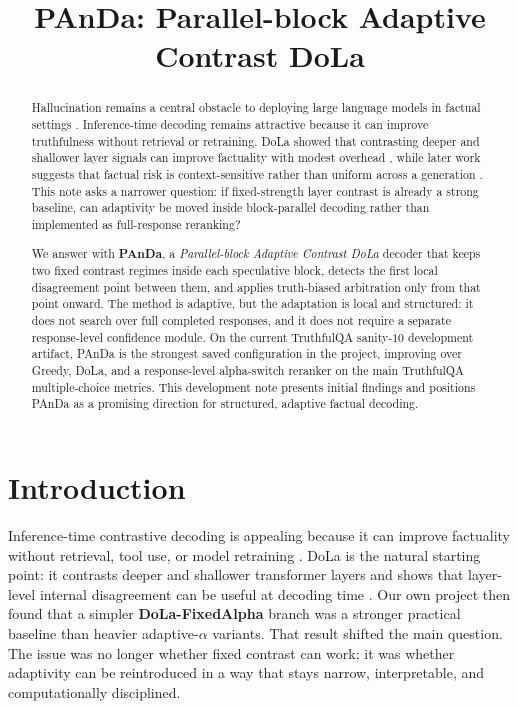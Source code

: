 \documentclass[10pt,twocolumn]{article}
\title{PAnDa: Parallel-block Adaptive Contrast DoLa}
\author{}
\date{}
\begin{document}
\maketitle

\begin{abstract}
Hallucination remains a central obstacle to deploying large language models in factual settings \citep{ji2023survey}. Inference-time decoding remains attractive because it can improve truthfulness without retrieval or retraining. DoLa showed that contrasting deeper and shallower layer signals can improve factuality with modest overhead \citep{chuang2023dola}, while later work suggests that factual risk is context-sensitive rather than uniform across a generation \citep{wan2023sequence,wastl2025token,zhang2025actlcd}. This note asks a narrower question: if fixed-strength layer contrast is already a strong baseline, can adaptivity be moved inside block-parallel decoding rather than implemented as full-response reranking?

We answer with \textbf{PAnDa}, a \emph{Parallel-block Adaptive Contrast DoLa} decoder that keeps two fixed contrast regimes inside each speculative block, detects the first local disagreement point between them, and applies truth-biased arbitration only from that point onward. The method is adaptive, but the adaptation is local and structured: it does not search over full completed responses, and it does not require a separate response-level confidence module. On the current TruthfulQA sanity-\(10\) development artifact, PAnDa is the strongest saved configuration in the project, improving over Greedy, DoLa, and a response-level alpha-switch reranker on the main TruthfulQA multiple-choice metrics. This development note presents initial findings and positions PAnDa as a promising direction for structured, adaptive factual decoding.
\end{abstract}

\section{Introduction}
Inference-time contrastive decoding is appealing because it can improve factuality without retrieval, tool use, or model retraining \citep{ji2023survey,lewis2020retrieval}. DoLa is the natural starting point: it contrasts deeper and shallower transformer layers and shows that layer-level internal disagreement can be useful at decoding time \citep{chuang2023dola}. Our own project then found that a simpler \textbf{DoLa-FixedAlpha} branch was a stronger practical baseline than heavier adaptive-\(\alpha\) variants. That result shifted the main question. The issue was no longer whether fixed contrast can work; it was whether adaptivity can be reintroduced in a way that stays narrow, interpretable, and computationally disciplined.
\end{document}
